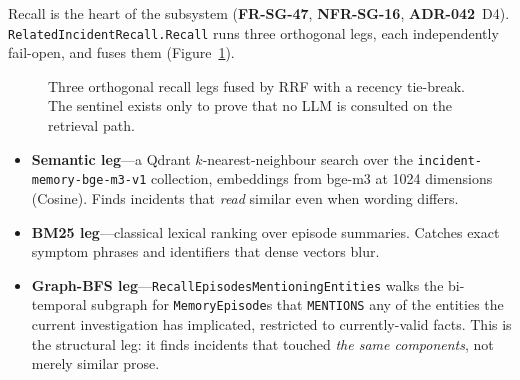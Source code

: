 \documentclass[11pt]{article}
\begin{document}
Recall is the heart of the subsystem (\textbf{FR-SG-47}, \textbf{NFR-SG-16},
\textbf{ADR-042}~D4). \texttt{RelatedIncidentRecall.Recall} runs three orthogonal
legs, each independently fail-open, and fuses them (Figure~\ref{fig:recall}).

\begin{figure}[ht]
\centering
{}
\caption{Three orthogonal recall legs fused by RRF with a recency tie-break. The
sentinel exists only to prove that no LLM is consulted on the retrieval path.}
\label{fig:recall}
\end{figure}

\begin{itemize}
  \item \textbf{Semantic leg}---a Qdrant $k$-nearest-neighbour search over the
    \texttt{incident-memory-bge-m3-v1} collection, embeddings from bge-m3 at 1024
    dimensions (Cosine). Finds incidents that \emph{read} similar even when
    wording differs.
  \item \textbf{BM25 leg}---classical lexical ranking over episode summaries.
    Catches exact symptom phrases and identifiers that dense vectors blur.
  \item \textbf{Graph-BFS leg}---\texttt{RecallEpisodesMentioningEntities} walks
    the bi-temporal subgraph for \texttt{MemoryEpisode}s that \texttt{MENTIONS}
    any of the entities the current investigation has implicated, restricted to
    currently-valid facts. This is the structural leg: it finds incidents that
    touched \emph{the same components}, not merely similar prose.
\end{itemize}
\end{document}
